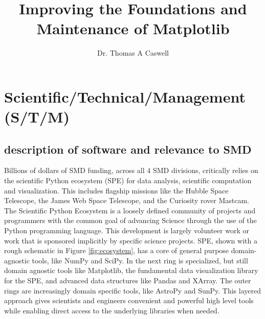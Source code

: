 \documentclass[12pt]{article}
\numberwithin{page}{section}
\begin{document}
\title{Improving the Foundations and Maintenance of Matplotlib}
\author{Dr. Thomas A Caswell}
\date{}
\maketitle

\setcounter{tocdepth}{2}
\tableofcontents
\thispagestyle{empty}
\newpage

\section{Scientific/Technical/Management (S/T/M)}
\setcounter{page}{1}

\subsection{description of software and relevance to SMD}

Billions of dollars of SMD funding, across all 4 SMD divisions,
critically relies on the scientific Python ecosystem (SPE) for data
analysis, scientific computation and visualization.  This includes
flagship missions like the Hubble Space Telescope, the James Web Space
Telescope, and the Curiosity rover
Mastcam\cite{https://doi.org/10.1002/2016EA000219}.  The Scientific
Python Ecosystem is a loosely defined community of projects and
programmers with the common goal of advancing Science through the use
of the Python programming language.  This development is largely
volunteer work or work that is sponsored implicitly by specific
science projects.  SPE, shown with a rough schematic in Figure
\ref{fig:ecosystem}, has a core of general purpose domain-agnostic
tools, like NumPy\cite{Harris2020} and SciPy\cite{Virtanen2020}. In
the next ring is specialized, but still domain agnostic tools like
Matplotlib\cite{Hunter:2007}, the fundamental data visualization
library for the SPE, and advanced data structures like Pandas and
XArray.  The outer rings are increasingly domain specific tools, like
AstroPy\cite{robitaille2013astropy} and
SunPy\cite{sunpy_community2020}.  This layered approach gives
scientists and engineers convenient and powerful high level tools
while enabling direct access to the underlying libraries when needed.
\end{document}
